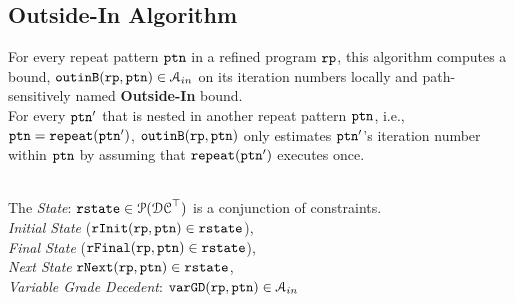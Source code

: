 \subsection{Outside-In Algorithm
}
\label{sec:outinalg}
%
For every repeat pattern $\mathtt{ptn}$ in a refined program $\mathtt{rp}$, 
this algorithm
computes a bound, $\mathtt{outinB}(\mathtt{rp}, \mathtt{ptn}) \in \mathcal{A}_{in}$ on its iteration numbers locally and path-sensitively
named \textbf{Outside-In} bound.
\\
For every $\mathtt{ptn}'$ that is nested
in another repeat pattern $\mathtt{ptn}$, i.e., $\mathtt{ptn} = \mathtt{repeat}(\mathtt{ptn}')$,
$\mathtt{outinB}(\mathtt{rp}, \mathtt{ptn})$ only estimates
$\mathtt{ptn}'$'s iteration number within $\mathtt{ptn}$ by assuming that $\mathtt{repeat}(\mathtt{ptn}')$ executes once.

\\
The \emph{State}: 
$\mathtt{rstate} \in \mathcal{P}(\mathcal{DC}^{\top})$ is a conjunction of constraints.
\\
\emph{Initial State} ($\mathtt{rInit}(\mathtt{rp}, \mathtt{ptn}) \in \mathtt{rstate}$), 
\\
\emph{Final State} ($\mathtt{rFinal}(\mathtt{rp}, \mathtt{ptn}) \in \mathtt{rstate}$),
\\
\emph{Next State} $\mathtt{rNext}(\mathtt{rp}, \mathtt{ptn}) \in \mathtt{rstate}$,
\\
\emph{Variable Grade Decedent}: $\mathtt{varGD}(\mathtt{rp}, \mathtt{ptn}) \in \mathcal{A}_{in}$

